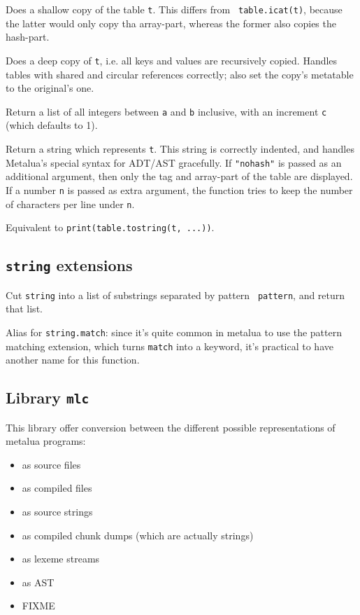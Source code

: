 Does a shallow copy of the table {\tt t}. This differs from {\tt
  table.icat(t)}, because the latter would only copy tha array-part,
whereas the former also copies the hash-part.


Does a deep copy of {\tt t}, i.e. all keys and values are recursively
copied. Handles tables with shared and circular references correctly;
also set the copy's metatable to the original's one.


Return a list of all integers between {\tt a} and {\tt b} inclusive,
with an increment {\tt c} (which defaults to 1).


Return a string which represents {\tt t}. This string is correctly
indented, and handles Metalua's special syntax for ADT/AST
gracefully. If {\tt"nohash"} is passed as an additional argument, then
only the tag and array-part of the table are displayed. If a number
{\tt n} is passed as extra argument, the function tries to keep the
number of characters per line under {\tt n}.


Equivalent to {\tt print(table.tostring(t, ...))}.

\subsection{{\tt string} extensions}

Cut {\tt string} into a list of substrings separated by pattern {\tt
  pattern}, and return that list.



Alias for {\tt string.match}: since it's quite common in metalua to
use the pattern matching extension, which turns {\tt match} into a
keyword, it's practical to have another name for this function.

\subsection{Library {\tt mlc}}
This library offer conversion between the different possible
representations of metalua programs:
\begin{itemize}
\item as source files
\item as compiled files
\item as source strings
\item as compiled chunk dumps (which are actually strings)
\item as lexeme streams
\item as AST
\item FIXME
\end{itemize}

